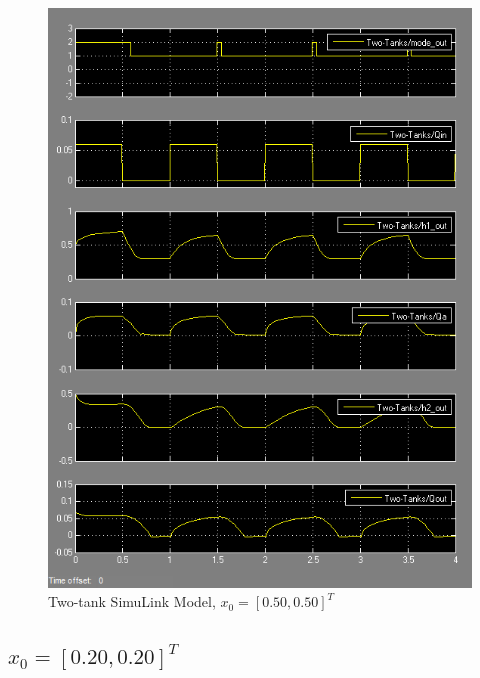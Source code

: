 \documentclass[letterpaper]{article}
\begin{document}
\begin{figure}[h!]
\centering
\includegraphics[scale=0.7]{hw8_50_50.png}
\caption{Two-tank SimuLink Model, $x_0 = [0.50, 0.50]^T$ }
\label{fig:two-tank-model-50-50}
\end{figure}

\subsection{$x_0 = [0.20, 0.20]^T$}
\end{document}
